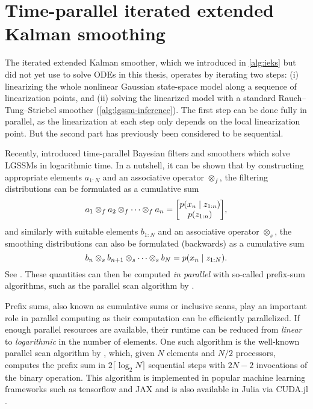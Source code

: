 \documentclass{mimosis}
\begin{document}
\section{Time-parallel iterated extended Kalman smoothing}
\label{sec:org060d737}
\label{sec:pint:ieks}
The iterated extended Kalman smoother, which we introduced in \cref{alg:ieks} but did not yet use to solve ODEs in this thesis,
operates by iterating two steps:
(i) linearizing the whole nonlinear Gaussian state-space model along a sequence of linearization points, and
(ii) solving the linearized model with a standard Rauch--Tung--Striebel smoother (\cref{alg:lgssm-inference}).
The first step can be done fully in parallel, as the linearization at each step only depends on the local linearization point.
But the second part has previously been considered to be sequential.

Recently, \textcite{Sarkka2021} introduced time-parallel Bayesian filters and smoothers which solve LGSSMs in logarithmic time.
In a nutshell, it can be shown that by constructing appropriate elements \(a_{1:N}\) and an associative operator \(\otimes_f\), the filtering distributions can be formulated as a cumulative sum
\begin{equation}
  a_1 \otimes_f a_2 \otimes_f \dots \otimes_f a_n = \mqty[ \p(\st_n \mid \obs_{1:n}) \\ \p(\obs_{1:n}) ],
\end{equation}
and similarly
with suitable elements
\(b_{1:N}\) and an associative operator \(\otimes_s\), the smoothing distributions can also be formulated (backwards) as a cumulative sum
\begin{equation}
  b_n \otimes_s b_{n+1} \otimes_s \dots \otimes_s b_N = \p(\st_n \mid \obs_{1:N}).
\end{equation}
See \textcite[Theorems 3 and 6]{Sarkka2021}.
These quantities can then be computed \emph{in parallel} with so-called prefix-sum algorithms, such as the parallel scan algorithm by \textcite{Blelloch1989}.

\begin{remark}
Prefix sums, also known as cumulative sums or inclusive scans, play an important role in parallel computing as their computation can be efficiently parallelized.
If enough parallel resources are available, their runtime can be reduced from \emph{linear} to \emph{logarithmic} in the number of elements.
One such algorithm is the well-known parallel scan algorithm by \textcite{Blelloch1989}, which, given \(N\) elements and \(N/2\) processors, computes the prefix sum in \(2 \lceil \log_2 N \rceil\) sequential steps with \(2N-2\) invocations of the binary operation.
This algorithm is implemented in popular machine learning frameworks such as tensorflow \parencite{tensorflow2015-whitepaper} and JAX \parencite{jax2018github} and is also available in Julia via CUDA.jl
\parencite{besard2018juliagpu,besard2019prototyping}.
\end{remark}
\end{document}
